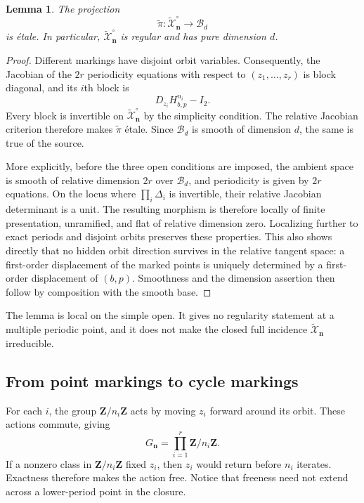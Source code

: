 \documentclass[11pt]{article}
\newtheorem{lemma}[theorem]{Lemma}
\theoremstyle{definition}
\theoremstyle{remark}
\newcommand{\Z}{\mathbf Z}
\newcommand{\cB}{\mathcal B}
\newcommand{\tX}{\widetilde{\mathcal X}}
\newcommand{\bn}{\mathbf n}
\begin{document}
\begin{lemma}
\label{lem:point-etale}
The projection
\[
  \widetilde\pi:\tX_{\bn}^{\circ}\longrightarrow\cB_d
\]
is étale.  In particular, $\tX_{\bn}^{\circ}$ is regular and has pure
dimension $d$.
\end{lemma}

\begin{proof}
Different markings have disjoint orbit variables.  Consequently, the
Jacobian of the $2r$ periodicity equations with respect to
$(z_1,\ldots,z_r)$ is block diagonal, and its $i$th block is
\[
  D_{z_i}H_{b,p}^{n_i}-I_2.
\]
Every block is invertible on $\tX_{\bn}^{\circ}$ by the simplicity
condition.  The relative Jacobian criterion therefore makes
$\widetilde\pi$ étale.  Since $\cB_d$ is smooth of dimension $d$, the same
is true of the source.

More explicitly, before the three open conditions are imposed, the ambient
space is smooth of relative dimension $2r$ over $\cB_d$, and periodicity is
given by $2r$ equations.  On the locus where
$\prod_i\Delta_i$ is invertible, their relative Jacobian determinant is a
unit.  The resulting morphism is therefore locally of finite presentation,
unramified, and flat of relative dimension zero.  Localizing further to
exact periods and disjoint orbits preserves these properties.  This also
shows directly that no hidden orbit direction survives in the relative
tangent space: a first-order displacement of the marked points is uniquely
determined by a first-order displacement of $(b,p)$.  Smoothness and the
dimension assertion then follow by composition with the smooth base.
\end{proof}

The lemma is local on the simple open.  It gives no regularity statement at
a multiple periodic point, and it does not make the closed full incidence
$\tX_{\bn}$ irreducible.

\subsection{From point markings to cycle markings}

For each $i$, the group $\Z/n_i\Z$ acts by moving $z_i$ forward around its
orbit.  These actions commute, giving
\[
  G_{\bn}=\prod_{i=1}^r\Z/n_i\Z.
\]
If a nonzero class in $\Z/n_i\Z$ fixed $z_i$, then $z_i$ would return before
$n_i$ iterates.  Exactness therefore makes the action free.  Notice that
freeness need not extend across a lower-period point in the closure.
\end{document}

